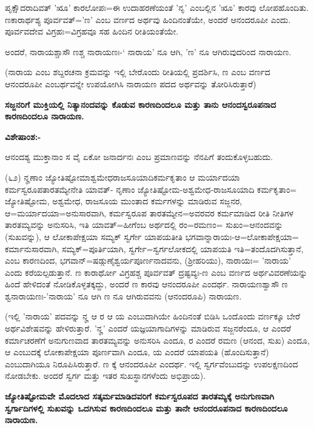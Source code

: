 ಪೃಕ್ಷೌದರಾದಿವತ್ 'ೠ' ಕಾರಲೋಪಃ=ಈ ಉದಾಹರಣೆಯಂತೆ 'ನೃ' ಎಂಬಲ್ಲಿನ 'ೠ' ಕಾರವು ಲೋಪಹೊಂದಿತು. ಣಕಾರಾರ್ಥಶ್ಯ ಪೂರ್ವವತ್='ಣ' ಎಂಬ ವರ್ಣದ ಅರ್ಥವು ಹಿಂದಿನಂತೆಯೇ, ಅಂದರೆ ಆನಂದರೂಪೀ ಎಂದು. ಪೂರ್ವವದೇವ ವಿಗ್ರಹಃ=ವಿಗ್ರಹವೂ ಸಹ ಹಿಂದಿನ ರೀತಿಯಂತೆಯೇ.

ಅಂದರೆ, ನಾರಾಯಶ್ಚಾಸೌ ಣಶ್ಚ ನಾರಾಯಣಃ-` ನಾರಾಯ' ನೂ ಆಗಿ, 'ಣ' ನೂ ಆಗಿರುವುದರಿಂದ ನಾರಾಯಣ.

(ನಾರಾಯ ಎಂಬ ಶಬ್ದರಚನಾ ಕ್ರಮವನ್ನು ಇಲ್ಲಿ ಬೇರೊಂದು ರೀತಿಯಲ್ಲಿ ಪ್ರದರ್ಶಿಸಿ, ಣ ಎಂಬ ವರ್ಣದ ಆನಂದರೂಪೀ ಎಂಬರ್ಥವನ್ನೇ ಉಪಯೋಗಿಸಿ ನಾರಾಯಣ ಪದದ ಅರ್ಥವನ್ನು ತೋರಿಸಿರುತ್ತಾರೆ)

\begin{center}
\textbf{ಸಜ್ಜನರಿಗೆ ಮುಕ್ತಿಯಲ್ಲಿ ನಿತ್ಯಾನಂದವನ್ನು ಕೊಡುವ ಕಾರಣದಿಂದಲೂ ಮತ್ತು ತಾನು ಆನಂದಸ್ವರೂಪನಾದ ಕಾರಣದಿಂದಲೂ ನಾರಾಯಣ.}
\end{center}

\noindent
\textbf{ವಿಶೇಷಾಂಶ:-}

ಆನಂದಶ್ಯ ಮುಕ್ತಾನಾಂ ಸ ವೈ ಏಕೋ ಜನಾರ್ದನಃ ಎಂಬ ಪ್ರಮಾಣವನ್ನು ನೆನಪಿಗೆ ತಂದುಕೊಳ್ಳಬಹುದು.

(೬೨) ನೄಣಾಂ ಜ್ಯೋತಿಷ್ಟೋಮಾಶ್ವಮೇಧರಾಜಸೂಯಾದಿಕರ್ಮಕೃತಾಂ ಆ ಮರ್ಯಾದಯಾ ಕರ್ಮಸ್ವರೂಪತಾರತಮ್ಯೇನೇತಿ ಯಾವತ್- ನೃಣಾಂ ಜ್ಯೋತಿಷ್ಟೋಮ-ಅಶ್ವಮೇಧ-ರಾಜಸೂಯಾದಿ ಕರ್ಮಕೃತಾಂ= ಜ್ಯೋತಿಷ್ಟೋಮ, ಅಶ್ವಮೇಧ, ರಾಜಸೂಯ ಮುಂತಾದ ಕರ್ಮಗಳನ್ನು ಮಾಡಿರುವ ಸಜ್ಜನರ, ಆ=ಮರ್ಯಾದಯಾ=ಅನುಸಾರವಾಗಿ, ಕರ್ಮಸ್ವರೂಪ ತಾರತಮ್ಯೇನ=ಅವರವರ ಕರ್ಮಮಾಡಿದ ರೀತಿ ನೀತಿಗಳ ತಾರತಮ್ಯವನ್ನು ಅನುಸರಿಸಿ, ಇತಿ ಯಾವತ್=ಹೀಗೆಂಬ ಅರ್ಥದಲ್ಲಿ ರಂ=ರಮಣಂ= ಸುಖಂ=ಆನಂದವನ್ನು (ಸುಖವನ್ನು), ಆ ಲೋಕಾಪೇಕ್ಷಯಾ ಸಮ್ಯಕ್ ಸ್ವರ್ಗೇ ಯಾಪಯತೀತಿ ಭಗವಾನ್ನಾರಾಯಃ-ಆ=ಲೋಕಾಪೇಕ್ಷಯಾ= ಕರ್ಮಾನುಸಾರವಾಗಿ, ಸಮ್ಯಕ್=ಪೂರ್ತಿಯಾಗಿ, ಸ್ವರ್ಗೇ=ಸ್ವರ್ಗಲೋಕದಲ್ಲಿ ಯಾಪಯತಿ ಇತಿ=ತಂದೊದಗಿಸುತ್ತಾನೆ, ಎಂಬ ಕಾರಣದಿಂದ, ಭಗವಾನ್=ಷಡ್ಗುಣೈಶ್ವರ್ಯಪೂರ್ಣನಾದವನು, (ಶ‍್ರೀಹರಿಯು), ನಾರಾಯಃ= 'ನಾರಾಯ' ಎಂದು ಕರೆಯಲ್ಪಡುತ್ತಾನೆ. ಣ ಕಾರಾರ್ಥೋ ವಿಗ್ರಹಶ್ಚ ಪೂರ್ವವತ್ ದ್ರಷ್ಟವ್ಯಃ-ಣ ಎಂಬ ವರ್ಣದ ಅರ್ಥವಿವರಣೆಯನ್ನು ಹಿಂದೆ ಹೇಳಿದಂತೆ ನೋಡಿಕೊಳ್ಳತಕ್ಕದ್ದು, ಅಂದರೆ ಣ ಕಾರವು ಆನಂದರೂಪೀ ಎಂದರ್ಥ. ನಾರಾಯಣಶ್ವಾಸೌ ಣ ಶ್ವನಾರಾಯಣಃ-'ನಾರಾಯ' ನೂ ಆಗಿ ಣ ನೂ ಆಗಿರುವವನು (ಆನಂದರೂಪಿ) ನಾರಾಯಣ.

(ಇಲ್ಲಿ 'ನಾರಾಯ' ಪದವನ್ನು ನೄ ಆ ರ ಆ ಯ ಎಂಬುದಾಗಿಯೇ ಹಿಂದಿನಂತೆ ಬಿಡಿಸಿ ಒಂದೊಂದು ವರ್ಣಕ್ಕೂ ಬೇರೆ ಅರ್ಥವಿಶೇಷವನ್ನು ಹೇಳಿರುತ್ತಾರೆ. 'ನೄ' ಎಂದರೆ ಯಜ್ಞಯಾಗಾದಿಗಳನ್ನು ಮಾಡಿರುವ ಸಜ್ಜನರೆಂದೂ, ಆ ಎಂದರೆ ಕರ್ಮಾಚರಣೆಗೆ ಅನುಗುಣವಾದ ತಾರತಮ್ಯವನ್ನು ಅನುಸರಿಸಿ ಎಂದೂ, ರ ಎಂದರೆ ರಮಣ (ಆನಂದ, ಸುಖ) ಎಂದೂ, ಆ ಎಂಬುದಕ್ಕೆ ಲೋಕಾಪೇಕ್ಷಯಾ ಪೂರ್ಣವಾಗಿ ಎಂದೂ, ಯ ಎಂದರೆ ಯಾಪಯತಿ (ಹೊಂದಿಸುತ್ತಾನೆ) ಎಂಬುದಾಗಿಯೂ ನಿರೂಪಿಸಿರುತ್ತಾರೆ. ಣ ಕ್ಕೆ ಆನಂದರೂಪೀ ಎಂದರ್ಥ. ಇಲ್ಲಿ ಸ್ವರ್ಗವೆಂಬುದನ್ನು ಉಪಲಕ್ಷಣದಿಂದ ನೋಡಬೇಕು. ಅಂದರೆ ಸ್ವರ್ಗ ಮತ್ತು ಇತರ ಸುಖಸ್ಥಾನಗಳೆಂದು ಅಭಿಪ್ರಾಯ).

\begin{center}
\textbf{ಜ್ಯೋತಿಷ್ಟೋಮವೇ ಮೊದಲಾದ ಸತ್ಕರ್ಮಮಾಡಿದವರಿಗೆ ಕರ್ಮಸ್ವರೂಪದ ತಾರತಮ್ಯಕ್ಕೆ ಅನುಗುಣವಾಗಿ ಸ್ವರ್ಗಾದಿಗಳಲ್ಲಿ ಸುಖವನ್ನು ಒದಗಿಸುವ ಕಾರಣದಿಂದಲೂ ಮತ್ತು ತಾನೇ ಆನಂದರೂಪನಾದ ಕಾರಣದಿಂದಲೂ ನಾರಾಯಣ.}
\end{center}

